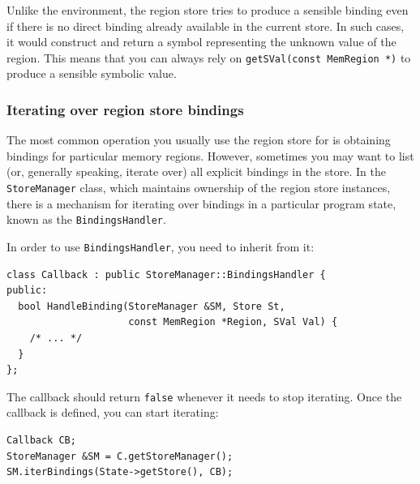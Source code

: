 \documentclass[a4paper,12pt]{article}
\newenvironment{nobr}{\begin{minipage}{\textwidth}\setlength\parskip{1em}
}{\end{minipage}\ignorespacesafterend}
\begin{document}
Unlike the environment, the region store tries to produce a sensible binding even if there is no direct binding already available in the current store. In such cases, it would construct and return a symbol representing the unknown value of the region. This means that you can always rely on \lstinline|getSVal(const MemRegion *)| to produce a sensible symbolic value.

\subsubsection{Iterating over region store bindings}\label{subsubsec:bindings_handler}

The most common operation you usually use the region store for is obtaining bindings for particular memory regions. However, sometimes you may want to list (or, generally speaking, iterate over) all explicit bindings in the store. In the \lstinline|StoreManager| class, which maintains ownership of the region store instances, there is a mechanism for iterating over bindings in a particular program state, known as the \lstinline|BindingsHandler|.

\begin{nobr}
In order to use \lstinline|BindingsHandler|, you need to inherit from it:

\begin{lstlisting}[style=cplusplus,numbers=none]
class Callback : public StoreManager::BindingsHandler {
public:
  bool HandleBinding(StoreManager &SM, Store St,
                     const MemRegion *Region, SVal Val) {
    /* ... */
  }
};
\end{lstlisting}
\end{nobr}

\begin{nobr}
The callback should return \lstinline|false| whenever it needs to stop iterating. Once the callback is defined, you can start iterating:

\begin{lstlisting}[style=cplusplus,numbers=none]
Callback CB;
StoreManager &SM = C.getStoreManager();
SM.iterBindings(State->getStore(), CB);
\end{lstlisting}
\end{nobr}
\end{document}
